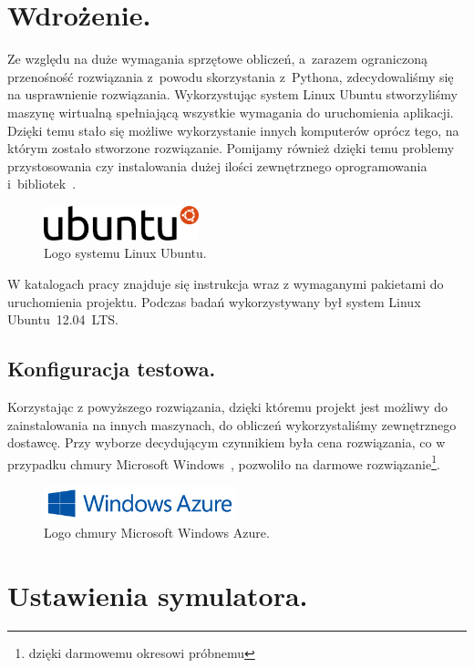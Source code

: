 \documentclass[twoside,12pt]{report}
\begin{document}
\section{Wdrożenie.}

Ze względu na duże wymagania sprzętowe obliczeń, a~zarazem ograniczoną przenośność rozwiązania z~powodu skorzystania z~Pythona, zdecydowaliśmy się na usprawnienie rozwiązania. Wykorzystując system Linux Ubuntu stworzyliśmy maszynę wirtualną spełniającą wszystkie wymagania do uruchomienia aplikacji. Dzięki temu stało się możliwe wykorzystanie innych komputerów oprócz tego, na którym zostało stworzone rozwiązanie. Pomijamy również dzięki temu problemy przystosowania czy instalowania dużej ilości zewnętrznego oprogramowania i~bibliotek~\cite{ubuntu}.

\begin{figure}[ht]
\centering
\includegraphics[width=0.4\textwidth]{img/ubuntu}
\caption{Logo systemu Linux Ubuntu.}
\end{figure}

W katalogach pracy znajduje się instrukcja wraz z wymaganymi pakietami do uruchomienia projektu. Podczas badań wykorzystywany był system Linux Ubuntu~12.04~LTS.

\subsection{Konfiguracja testowa.}

Korzystając z powyższego rozwiązania, dzięki któremu projekt jest możliwy do zainstalowania na innych maszynach, do obliczeń wykorzystaliśmy zewnętrznego dostawcę. Przy wyborze decydującym czynnikiem była cena rozwiązania, co w przypadku chmury Microsoft Windows~\cite{azure}, pozwoliło na darmowe rozwiązanie\footnote{dzięki darmowemu okresowi próbnemu}.

\begin{figure}[ht]
\centering
\includegraphics[width=0.5\textwidth]{img/azure}
\caption{Logo chmury Microsoft Windows Azure.}
\end{figure}

\section{Ustawienia symulatora.}\label{ukt}
\end{document}
